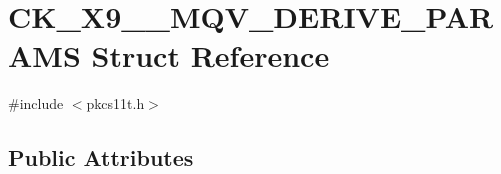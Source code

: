 \hypertarget{struct_c_k___x9__42___m_q_v___d_e_r_i_v_e___p_a_r_a_m_s}{}\section{C\+K\+\_\+\+X9\+\_\+\_\+\+M\+Q\+V\+\_\+\+D\+E\+R\+I\+V\+E\+\_\+\+P\+A\+R\+A\+MS Struct Reference}
\label{struct_c_k___x9__42___m_q_v___d_e_r_i_v_e___p_a_r_a_m_s}


{\ttfamily \#include $<$pkcs11t.\+h$>$}

\subsection*{Public Attributes}
